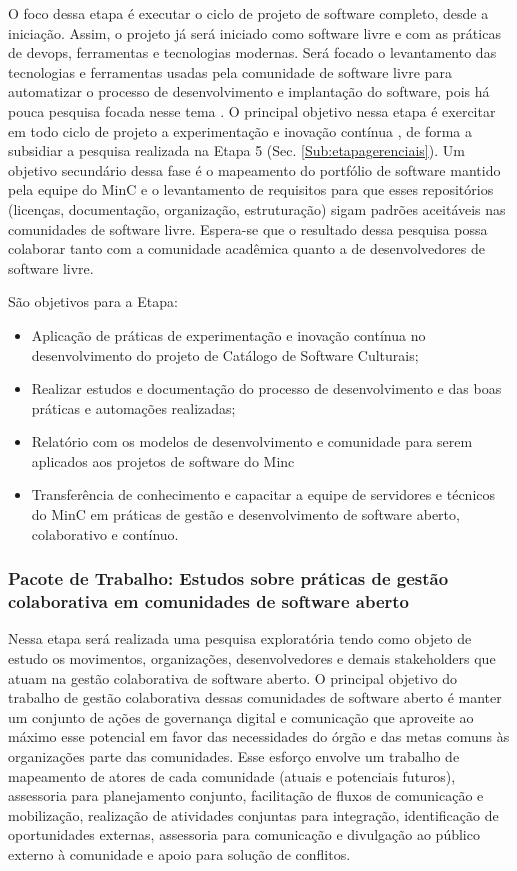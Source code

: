 O foco dessa etapa é executar o ciclo de projeto de software completo, desde a iniciação.
Assim, o projeto já será iniciado como software livre e com as práticas de devops, 
ferramentas e tecnologias modernas. Será focado o levantamento das tecnologias e 
ferramentas usadas pela comunidade de software livre para automatizar o processo de 
desenvolvimento e implantação do software, pois há pouca pesquisa focada nesse 
tema \cite{DBLP:conf/icse/KrafftSF16}. O principal objetivo nessa etapa é exercitar 
em todo ciclo de projeto a experimentação e inovação contínua \cite{DBLP:journals/jss/FitzgeraldS17, DBLP:conf/icse/KrafftSF16}, 
de forma a subsidiar a pesquisa realizada na Etapa 5 (Sec. \ref{Sub:etapagerenciais}). Um objetivo
secundário dessa fase é o mapeamento do portfólio de software mantido pela equipe 
do MinC e o levantamento de requisitos para que esses repositórios (licenças, 
documentação, organização, estruturação) sigam padrões aceitáveis nas comunidades 
de software livre. Espera-se que o resultado dessa pesquisa possa colaborar tanto 
com a comunidade acadêmica quanto a de desenvolvedores de software livre. 

São objetivos para a Etapa:

\begin{itemize}
  \item Aplicação de práticas de experimentação e inovação contínua no 
    desenvolvimento do projeto de Catálogo de Software Culturais;
  \item Realizar estudos e documentação do processo de desenvolvimento e das boas 
    práticas e automações realizadas;
  \item Relatório com os  modelos de desenvolvimento e comunidade para serem 
    aplicados aos projetos de software do Minc
  \item Transferência de conhecimento e capacitar a equipe de servidores e técnicos 
  do MinC em práticas de gestão e desenvolvimento de software aberto, colaborativo e contínuo.
\end{itemize}

\subsubsection{Pacote de Trabalho: Estudos sobre práticas de gestão colaborativa 
em comunidades de software aberto}

Nessa etapa será realizada uma pesquisa exploratória tendo como objeto de estudo 
os movimentos, organizações, desenvolvedores e demais stakeholders que atuam na gestão
colaborativa de software aberto. O principal objetivo do trabalho de gestão colaborativa
dessas comunidades de software aberto é manter um conjunto de ações de governança 
digital e comunicação que aproveite ao máximo esse potencial em favor das necessidades
do órgão e das metas comuns às organizações parte das comunidades. Esse esforço 
envolve um trabalho de mapeamento de atores de cada comunidade (atuais e 
potenciais futuros), assessoria para planejamento conjunto, facilitação de fluxos 
de comunicação e mobilização, realização de atividades conjuntas para integração, 
identificação de oportunidades externas, assessoria para comunicação e divulgação 
ao público externo à comunidade e apoio para solução de conflitos.

